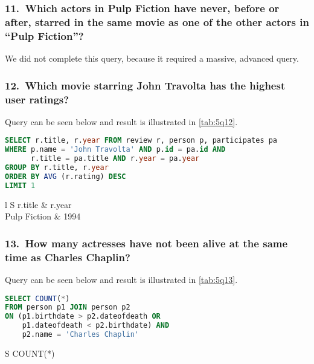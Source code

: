 \subsubsection{11.\ Which actors in Pulp Fiction have never, before or after, starred in the same movie as one of the other actors in “Pulp Fiction”?}
We did not complete this query, because it required a massive, advanced query.

\subsubsection{12.\ Which movie starring John Travolta has the highest user ratings?}
Query can be seen below and result is illustrated in \cref{tab:5q12}.

\begin{lstlisting}[language=SQL]
SELECT r.title, r.year FROM review r, person p, participates pa 
WHERE p.name = 'John Travolta' AND p.id = pa.id AND
      r.title = pa.title AND r.year = pa.year
GROUP BY r.title, r.year
ORDER BY AVG (r.rating) DESC
LIMIT 1
\end{lstlisting}

\begin{table}
  \centering
  \begin{tabular}[htpb]{l S}
    \toprule
    r.title & {r.year} \\
    \midrule
    Pulp Fiction & 1994 \\
    \bottomrule
  \end{tabular}
  \caption{Results of query 12}\label{tab:5q12}
\end{table}

\subsubsection{13.\ How many actresses have not been alive at the same time as Charles Chaplin?}
Query can be seen below and result is illustrated in \cref{tab:5q13}.

\begin{lstlisting}[language=SQL]
SELECT COUNT(*)
FROM person p1 JOIN person p2
ON (p1.birthdate > p2.dateofdeath OR
    p1.dateofdeath < p2.birthdate) AND
    p2.name = 'Charles Chaplin'
\end{lstlisting}
%
\begin{table}
  \centering
  \begin{tabular}[htpb]{S}
    \toprule
    {COUNT(*)} \\
     \\
    \bottomrule
  \end{tabular}
  \caption{Results of query 13}\label{tab:5q13}
\end{table}

